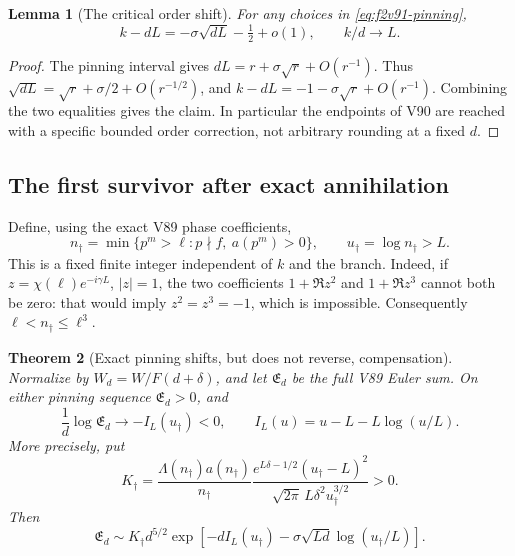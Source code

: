 \documentclass[11pt]{article}
\newtheorem{theorem}{Theorem}[section]
\newtheorem{lemma}[theorem]{Lemma}
\theoremstyle{definition}
\theoremstyle{remark}
\begin{document}
\begin{lemma}[The critical order shift]
\label{lem:f2v91-shift}
For any choices in \eqref{eq:f2v91-pinning},
\begin{equation}
 k-dL=-\sigma\sqrt{dL}-\tfrac12+o(1),\qquad k/d\to L.
 \label{eq:f2v91-shift}
\end{equation}
\end{lemma}
\begin{proof}
The pinning interval gives \(dL=r+\sigma\sqrt r+O(r^{-1})\).
Thus \(\sqrt{dL}=\sqrt r+\sigma/2+O(r^{-1/2})\), and
\(k-dL=-1-\sigma\sqrt r+O(r^{-1})\).  Combining the two
equalities gives the claim.  In particular the endpoints of V90 are
reached with a specific bounded order correction, not arbitrary
rounding at a fixed \(d\).
\end{proof}

\subsection{The first survivor after exact annihilation}

Define, using the exact V89 phase coefficients,
\begin{equation}
 n_\dagger=\min\{p^m>\ell:p\nmid f,\ a(p^m)>0\},
 \qquad u_\dagger=\log n_\dagger>L.
 \label{eq:f2v91-survivor}
\end{equation}
This is a fixed finite integer independent of \(k\) and the branch.
Indeed, if \(z=\chi(\ell)e^{-i\gamma L}\), \(|z|=1\), the two
coefficients \(1+\Re z^2\) and \(1+\Re z^3\) cannot both be
zero: that would imply \(z^2=z^3=-1\), which is impossible.
Consequently \(\ell<n_\dagger\le\ell^3\).

\begin{theorem}[Exact pinning shifts, but does not reverse, compensation]
\label{thm:f2v91-compensation}
Normalize by \(\widehat W_d=W/F(d+\delta)\), and let
\(\mathfrak E_d\) be the full V89 Euler sum.  On either pinning
sequence \(\mathfrak E_d>0\), and
\begin{equation}
 \frac1d\log\mathfrak E_d\longrightarrow
 -I_L(u_\dagger)<0,\qquad
 I_L(u)=u-L-L\log(u/L).
 \label{eq:f2v91-rate}
\end{equation}
More precisely, put
\begin{equation}
 K_\dagger=
 \frac{\Lambda(n_\dagger)a(n_\dagger)}{n_\dagger}
 \frac{e^{L\delta-1/2}(u_\dagger-L)^2}
      {\sqrt{2\pi}\,L\delta^2u_\dagger^{3/2}}>0.
 \label{eq:f2v91-constant}
\end{equation}
Then
\begin{equation}
 \mathfrak E_d\sim K_\dagger d^{5/2}
 \exp\left[-dI_L(u_\dagger)
       -\sigma\sqrt{Ld}\log(u_\dagger/L)\right].
 \label{eq:f2v91-sharp}
\end{equation}
\end{theorem}
\end{document}
